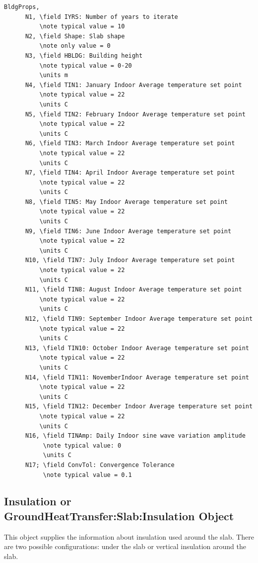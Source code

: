 \begin{lstlisting}
BldgProps,
      N1, \field IYRS: Number of years to iterate
          \note typical value = 10
      N2, \field Shape: Slab shape
          \note only value = 0
      N3, \field HBLDG: Building height
          \note typical value = 0-20
          \units m
      N4, \field TIN1: January Indoor Average temperature set point
          \note typical value = 22
          \units C
      N5, \field TIN2: February Indoor Average temperature set point
          \note typical value = 22
          \units C
      N6, \field TIN3: March Indoor Average temperature set point
          \note typical value = 22
          \units C
      N7, \field TIN4: April Indoor Average temperature set point
          \note typical value = 22
          \units C
      N8, \field TIN5: May Indoor Average temperature set point
          \note typical value = 22
          \units C
      N9, \field TIN6: June Indoor Average temperature set point
          \note typical value = 22
          \units C
      N10, \field TIN7: July Indoor Average temperature set point
          \note typical value = 22
          \units C
      N11, \field TIN8: August Indoor Average temperature set point
          \note typical value = 22
          \units C
      N12, \field TIN9: September Indoor Average temperature set point
          \note typical value = 22
          \units C
      N13, \field TIN10: October Indoor Average temperature set point
          \note typical value = 22
          \units C
      N14, \field TIN11: NovemberIndoor Average temperature set point
          \note typical value = 22
          \units C
      N15, \field TIN12: December Indoor Average temperature set point
          \note typical value = 22
          \units C
      N16, \field TINAmp: Daily Indoor sine wave variation amplitude
           \note typical value: 0
           \units C
      N17; \field ConvTol: Convergence Tolerance
           \note typical value = 0.1
\end{lstlisting}

\subsection{Insulation or GroundHeatTransfer:Slab:Insulation Object}\label{insulation-or-groundheattransferslabinsulation-object}

This object supplies the information about insulation used around the slab. There are two possible configurations: under the slab or vertical insulation around the slab.

